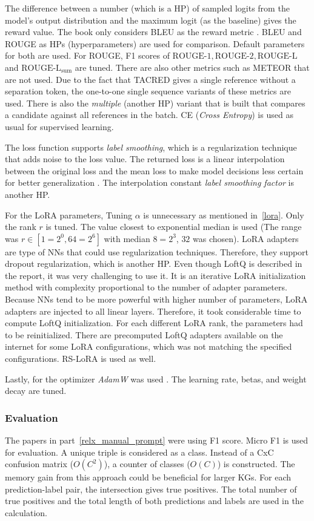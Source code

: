\documentclass{article}
\begin{document}
The difference between a number (which is a HP) of sampled logits from the model's output distribution and the maximum logit (as the baseline) gives the reward value. The book only considers BLEU as the reward metric \cite{lapan_deep_2020}. BLEU and ROUGE as HPs (hyperparameters) are used for comparison. Default parameters for both are used. For ROUGE, F1 scores of $\text{ROUGE-1}, \text{ROUGE-2}, \text{ROUGE-L}$ and $\text{ROUGE-L}_{\text{sum}}$ are tuned. There are also other metrics such as METEOR that are not used. Due to the fact that TACRED gives a single reference without a separation token, the one-to-one single sequence variants of these metrics are used. There is also the \textit{multiple} (another HP) variant that is built that compares a candidate against all references in the batch. CE (\textit{Cross Entropy}) is used as usual for supervised learning.

The loss function supports \textit{label smoothing}, which is a regularization technique that adds noise to the loss value. The returned loss is a linear interpolation between the original loss and the mean loss to make model decisions less certain for better generalization \cite{muller_when_2020}. The interpolation constant \textit{label smoothing factor} is another HP.

For the LoRA parameters, Tuning $\alpha$ is unnecessary as mentioned in~\ref{lora}. Only the rank $r$ is tuned. The value closest to exponential median is used (The range was $r \in [1=2^0, 64=2^6]$ with median $8=2^3$, $32$ was chosen). LoRA adapters are type of NNs that could use regularization techniques. Therefore, they support dropout regularization, which is another HP. Even though LoftQ is described in the report, it was very challenging to use it. It is an iterative LoRA initialization method with complexity proportional to the number of adapter parameters. Because NNs tend to be more powerful with higher number of parameters, LoRA adapters are injected to all linear layers. Therefore, it took considerable time to compute LoftQ initialization. For each different LoRA rank, the parameters had to be reinitialized. There are precomputed LoftQ adapters available on the internet for some LoRA configurations, which was not matching the specified configurations. RS-LoRA is used as well.

Lastly, for the optimizer \textit{AdamW} was used \cite{loshchilov_decoupled_2019}. The learning rate, betas, and weight decay are tuned.
\subsubsection{Evaluation}
The papers in part~\ref{relx_manual_prompt} were using F1 score. Micro F1 is used for evaluation. A unique triple is considered as a class. Instead of a CxC confusion matrix ($O(C^2)$), a counter of classes ($O(C)$) is constructed. The memory gain from this approach could be beneficial for larger KGs. For each prediction-label pair, the intersection gives true positives. The total number of true positives and the total length of both predictions and labels are used in the calculation.
\end{document}
